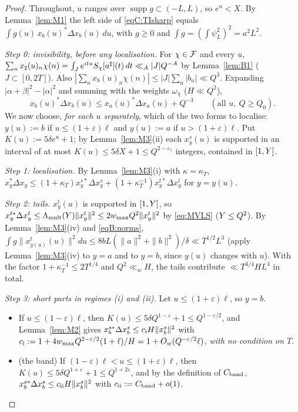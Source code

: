 \begin{proof}
Throughout, $u$ ranges over $\operatorname{supp}g\subset(-L,L)$, so $e^u<X$. By Lemma~\ref{lem:M1} the left side of \eqref{eqC:TIsharp} equals
$\int g(u)\,x_b(u)^*\Delta x_b(u)\,du$, with $g\ge0$ and $\int g=(\int\psi_L^2)^2=a^2L^2$.

\emph{Step 0: invisibility, before any localisation.} For $\chi\in\mathcal{F}$ and every $u$,
$\sum_nx_\sharp(u)_n\chi(n)=\int_Je^{itu}S_\chi[a^\sharp](t)\,dt\ll_A|J|Q^{-A}$ by Lemma~\ref{lem:B1} ($J\subset[0,2T]$). Also
$|\sum_nx_b(u)_n\chi(n)|\le|J|\sum_n|b_n|\ll Q^3$. Expanding $|\alpha+\beta|^2-|\alpha|^2$ and summing with the weights $\omega_\chi$ ($H\ll Q^2$),
\begin{equation}\label{eqC:step0}
 x_b(u)^*\Delta x_b(u)\le x_a(u)^*\Delta x_a(u)+Q^{-3}\qquad(\text{all }u,\ Q\ge Q_0).
\end{equation}
We now choose, \emph{for each $u$ separately}, which of the two forms to localise: $y(u):=b$ if $u\le(1+\varepsilon)\ell$ and $y(u):=a$ if
$u>(1+\varepsilon)\ell$. Put $K(u):=5\delta e^u+1$; by Lemma~\ref{lem:M3}(ii) each $x_y^s(u)$ is supported in an interval of at most $K(u)\le5\delta X+1\le Q^{2-\varepsilon_1}$
integers, contained in $[1,Y]$.

\emph{Step 1: localisation.} By Lemma~\ref{lem:M3}(i) with $\kappa=\kappa_T$,
$x_y^*\Delta x_y\le(1+\kappa_T)x_y^{s*}\Delta x_y^s+(1+\kappa_T^{-1})x_y^{t*}\Delta x_y^t$ for $y=y(u)$.

\emph{Step 2: tails.} $x_y^t(u)$ is supported in $[1,Y]$, so $x_y^{t*}\Delta x_y^t\le\Lambda_{\mathrm{mult}}(Y)\|x_y^t\|^2\le2w_{\max}Q^2\|x_y^t\|^2$ by
\eqref{eq:MVLS} ($Y\le Q^2$). By Lemma~\ref{lem:M3}(iv) and \eqref{eqB:norms}, $\int g\|x_{y(u)}^t(u)\|^2du\le8bL(\|a\|^2+\|b\|^2)/\delta\ll T^{1/2}L^3$ (apply Lemma~\ref{lem:M3}(iv) to $y=a$ and to $y=b$, since $y(u)$ changes with $u$). With
the factor $1+\kappa_T^{-1}\le2T^{1/4}$ and $Q^2\ll_wH$, the tails contribute $\ll T^{3/4}HL^3$ in total.

\emph{Step 3: short parts in regimes (i) and (ii).} Let $u\le(1+\varepsilon)\ell$, so $y=b$.
\begin{itemize}
\item[(i)] If $u\le(1-\varepsilon)\ell$, then $K(u)\le5\delta Q^{1-\varepsilon}+1\le Q^{1-\varepsilon/2}$, and Lemma~\ref{lem:M2} gives
 $x_b^{s*}\Delta x_b^s\le c_{\rm i}H\|x_b^s\|^2$ with $c_{\rm i}:=1+4w_{\max}Q^{2-\varepsilon/2}(1+\ell)/H=1+O_w(Q^{-\varepsilon/2}\ell)$, \emph{with no condition on $T$}.
\item[(ii)] (the band) If $(1-\varepsilon)\ell<u\le(1+\varepsilon)\ell$, then $K(u)\le5\delta Q^{1+\varepsilon}+1\le Q^{1+2\varepsilon}$, and by the definition of
 $C_{\rm band}$, $x_b^{s*}\Delta x_b^s\le c_{\rm ii}H\|x_b^s\|^2$ with $c_{\rm ii}:=C_{\rm band}+o(1)$.
\end{itemize}


\end{proof}
